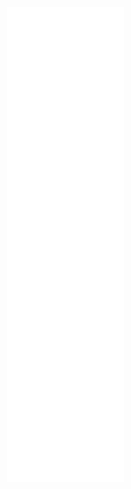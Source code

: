\begin{figure}[H]
\begin{center}
\leavevmode
\includegraphics[height=400pt]{classMenuStateHandler__coll__graph}
\end{center}
\end{figure}
